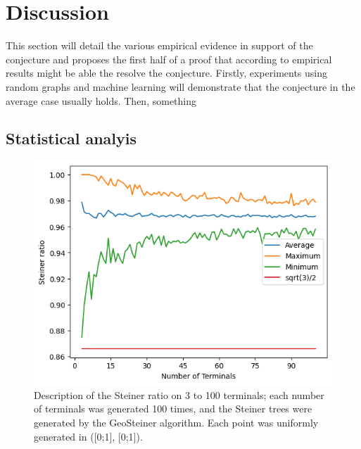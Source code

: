 \documentclass{mpaper}
\begin{document}
\section{Discussion}

This section will detail the various empirical evidence in support of the conjecture and proposes the first half of a proof that according to empirical results might be able the resolve the conjecture. Firstly, experiments using random graphs and machine learning will demonstrate that the conjecture in the average case usually holds. Then, something

\subsection{Statistical analyis}

\begin{figure}
  \begin{center}
  \includegraphics[scale=0.5]{plot2.png}
  \end{center}
  \caption{\label{fig:1}Description of the Steiner ratio on 3 to 100 terminals; each number of terminals was generated 100 times, and the Steiner trees were generated by the GeoSteiner algorithm. Each point was uniformly generated in ([0;1], [0;1]). }
\end{figure}
\end{document}
